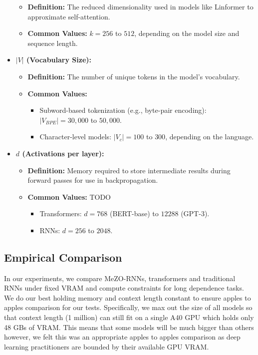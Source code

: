 \documentclass{article}
\begin{document}
\begin{itemize}
    \begin{itemize}
        \item \textbf{Definition:} The reduced dimensionality used in models like Linformer to approximate self-attention.
        \item \textbf{Common Values:} \(k = 256\) to \(512\), depending on the model size and sequence length.
    \end{itemize}
     \item \textbf{\(|V|\) (Vocabulary Size):}
    \begin{itemize}
        \item \textbf{Definition:} The number of unique tokens in the model's vocabulary.
        \item \textbf{Common Values:}
        \begin{itemize}
            \item Subword-based tokenization (e.g., byte-pair encoding): \(|V_{BPE}| = 30,000\) to \(50,000\).
            \item Character-level models: \(|V_c| = 100\) to \(300\), depending on the language.
        \end{itemize}
    \end{itemize}
    \item \textbf{\(d\) (Activations per layer):}
    \begin{itemize}
        \item \textbf{Definition:} Memory required to store intermediate results during forward passes for use in backpropagation.
        \item \textbf{Common Values:}  TODO
        \begin{itemize}
            \item Transformers: \(d = 768\) (BERT-base) to \(12288\) (GPT-3).
            \item RNNs: \(d = 256\) to \(2048\).
        \end{itemize}
    \end{itemize}
\end{itemize}


\subsection{Empirical Comparison}
In our experiments, we compare MeZO-RNNs, transformers and traditional RNNs under fixed VRAM and compute constraints for long dependence tasks. We do our best holding memory and context length constant to ensure apples to apples comparison for our tests. Specifically, we max out the size of all models so that context length (1 million) can still fit on a single A40 GPU which holds only 48 GBs of VRAM. This means that some models will be much bigger than others however, we felt this was an appropriate apples to apples comparison as deep learning practitioners are bounded by their available GPU VRAM. 
\end{document}
